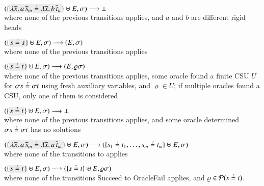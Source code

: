 \begin{description}[labelwidth=\widthof{\rm\textsf{Normalize$_{\alpha\eta}$}}]
      $(\{\selected{\lambda \overline{x}. \, a \, \overline{s}_m \unif \lambda \overline{x}. \, b \, \overline{t}_n}\}
      \uplus E, \sigma) \newunifarrow \bot$\\
      where none of the previous transitions applies, and
      $a$ and $b$ are different rigid heads
  \item[\rm\unifrulename{Delete}]  $(\{\selected{s \unif s}\}\uplus E, \sigma) \newunifarrow (E, \sigma)$\\
      where none of the previous transitions applies
  \item[\rm\unifrulename{OracleSucc}]
  $(\{\selected{s \unif t}\}\uplus E, \sigma) \newunifarrow (E, \varrho \sigma)$\\
      where none of the previous transitions applies, 
      some oracle found a finite CSU $U$ for $\sigma s \unif \sigma t $ using fresh auxiliary variables,
      and $\varrho \in U$; if multiple oracles found a CSU, only one of them is considered
  \item[\rm\unifrulename{OracleFail}]
  $(\{\selected{s \unif t}\}\uplus E, \sigma) \newunifarrow \bot$\\
  where none of the previous transitions applies, 
  and some oracle determined $\sigma s \unif \sigma t$ has no solutions
  \item[\rm\unifrulename{Decompose}]
      $(\{\selected{\lambda \overline{x}. \, a \, \overline{s}_m \unif \lambda \overline{x}. \, a \, \overline{t}_m}\}
      \uplus E, \sigma) 
      \newunifarrow 
      ( \{s_1 \unif t_1, \ldots ,s_m \unif t_m\} \uplus E,
      \sigma)$\\
      where none of the transitions  to  applies
  \item[\rm\textsf{Bind}]
      $(\{\selected{s \unif t}\} 
      \uplus E, \sigma) 
      \newunifarrow 
      (\{s \unif t\}
      \uplus E, \varrho \sigma)$\\
      where none of the transitions \textsf{Succeed} to \textsf{OracleFail} applies,
      and $\varrho\in\mathcal{P}(s \unif t)$.
\end{description}
